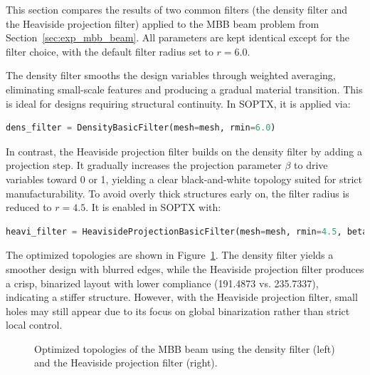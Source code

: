 \documentclass[mathpazo]{cicp}
\begin{document}
This section compares the results of two common filters (the density filter and the Heaviside projection filter) applied to the MBB beam problem from Section~\ref{sec:exp_mbb_beam}. All parameters are kept identical except for the filter choice, with the default filter radius set to $r=6.0$.

The density filter smooths the design variables through weighted averaging, eliminating small-scale features and producing a gradual material transition. This is ideal for designs requiring structural continuity. In SOPTX, it is applied via:
\begin{lstlisting}[language=python]
dens_filter = DensityBasicFilter(mesh=mesh, rmin=6.0)
\end{lstlisting}

In contrast, the Heaviside projection filter builds on the density filter by adding a projection step. It gradually increases the projection parameter $\beta$ to drive variables toward 0 or 1, yielding a clear black-and-white topology suited for strict manufacturability. To avoid overly thick structures early on, the filter radius is reduced to $r=4.5$. It is enabled in SOPTX with:
\begin{lstlisting}[language=python]
heavi_filter = HeavisideProjectionBasicFilter(mesh=mesh, rmin=4.5, beta=1, max_beta=512, continuation_iter=50)   
\end{lstlisting}

The optimized topologies are shown in Figure~\ref{fig:mbb_filter_all}. The density filter yields a smoother design with blurred edges, while the Heaviside projection filter produces a crisp, binarized layout with lower compliance (191.4873 vs. 235.7337), indicating a stiffer structure. However, with the Heaviside projection filter, small holes may still appear due to its focus on global binarization rather than strict local control.
\begin{figure}[htb]
	\centering
	\caption{Optimized topologies of the MBB beam using the density filter (left) and the Heaviside projection filter (right).}
	\label{fig:mbb_filter_all}
\end{figure}
\end{document}
